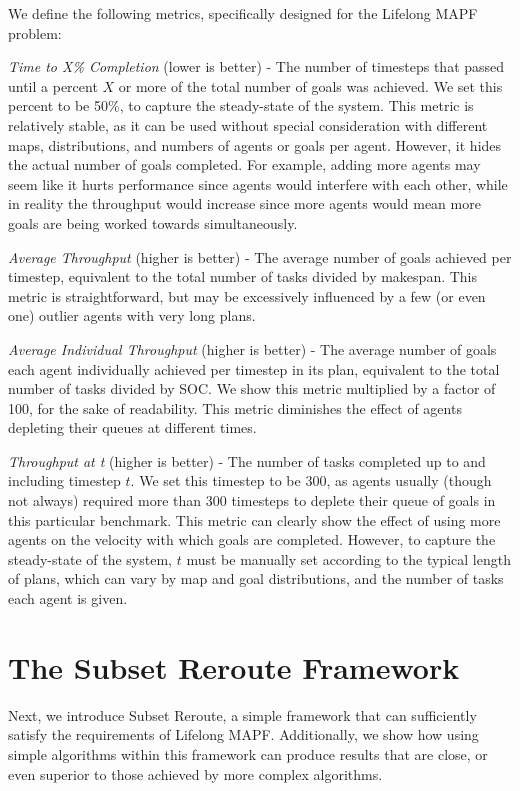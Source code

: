 \documentclass{article}
\newcommand{\soc}{SOC\xspace}
\newcommand{\sr}{Subset Reroute\xspace}
\newcommand{\mkspn}{makespan\xspace}
\newcommand{\lm}{Lifelong MAPF\xspace}
\newcommand{\avgthr}{Average Throughput\xspace}
\newcommand{\indthr}{Average Individual Throughput\xspace}
\newcommand{\timeto}{Time to X\% Completion\xspace}
\newcommand{\thrat}{Throughput at t\xspace}
\begin{document}
We define the following metrics, specifically designed for the \lm problem:

\emph{\timeto} (lower is better) - The number of timesteps that passed until a percent $X$ or more of the total number of goals was achieved. We set this percent to be 50\%, to capture the steady-state of the system. This metric is relatively stable, as it can be used without special consideration with different maps, distributions, and numbers of agents or goals per agent. However, it hides the actual number of goals completed. For example, adding more agents may seem like it hurts performance since agents would interfere with each other, while in reality the throughput would increase since more agents would mean more goals are being worked towards simultaneously.

\emph{\avgthr } (higher is better) \cite{li2020lifelong} - The average number of goals achieved per timestep, equivalent to the total number of tasks divided by \mkspn. This metric is straightforward, but may be excessively influenced by a few (or even one) outlier agents with very long plans.

\emph{\indthr} (higher is better) - The average number of goals each agent individually achieved per timestep in its plan, equivalent to the total number of tasks divided by \soc. We show this metric multiplied by a factor of 100, for the sake of readability. This metric diminishes the effect of agents depleting their queues at different times.

\emph{\thrat} (higher is better) - The number of tasks completed up to and including timestep $t$. We set this timestep to be 300, as agents usually (though not always) required more than 300 timesteps to deplete their queue of goals in this particular benchmark. This metric can clearly show the effect of using more agents on the velocity with which goals are completed. However, to capture the steady-state of the system, $t$ must be manually set according to the typical length of plans, which can vary by map and goal distributions, and the number of tasks each agent is given.

\section{The \sr Framework}

Next, we introduce \sr, a simple framework that can sufficiently satisfy the requirements of \lm. Additionally, we show how using simple algorithms within this framework can produce results that are close, or even superior to those achieved by more complex algorithms.
\end{document}
